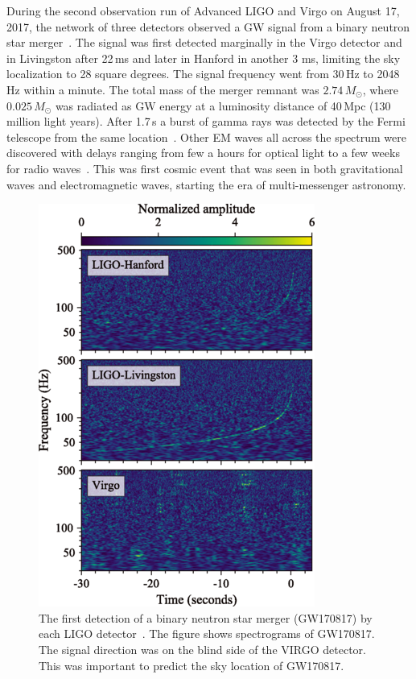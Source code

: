 \documentclass{ttuthes2007}
\begin{document}
During the second observation run of Advanced LIGO and Virgo on August 17, 2017,
the network of three detectors observed a \ac{GW} signal from a binary
neutron star merger~\cite{Abbott_2017}. The signal was first detected marginally in the Virgo
detector and in Livingston after 22\,ms and later in Hanford in another 3 ms,
limiting the sky localization to 28 square degrees. The signal frequency went
from 30\,Hz to 2048\,Hz within a minute. The total mass of the merger remnant
was $2.74\,M_\odot$, where $0.025\,M_\odot$ was radiated as \ac{GW} energy at a
luminosity distance of 40\,Mpc (130 million light years). After 1.7\,s a
burst of gamma rays was detected by the Fermi telescope from the same
location~\cite{Abbott_2017b}.
Other \ac{EM} waves all across the spectrum were discovered with delays ranging
from few a hours for optical
light to a few weeks for radio waves~\cite{Abbott_2017a}. This was first cosmic event that
was seen in both gravitational waves and electromagnetic waves, starting the era
of multi-messenger astronomy. 
\begin{figure}[bhtp!] 
        \includegraphics[width=\textwidth]{figure/GW170817.png}
	\caption{The first detection of a binary neutron star merger (GW170817) by each \ac{LIGO} detector~\cite{Abbott_2017}. The figure shows spectrograms of GW170817. The signal direction was on the blind side of the VIRGO detector. This was important to predict the sky location of GW170817.}
        \label{GW170817}                                                             
\end{figure}      
\end{document}
